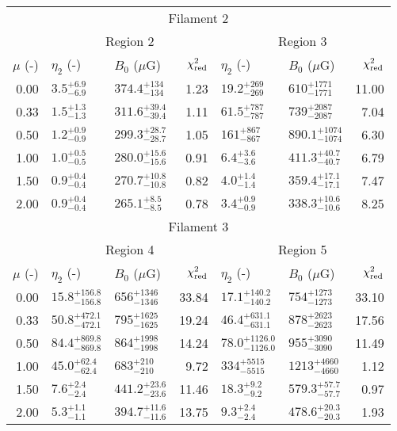 \begin{tabular}{@{}rllr llr@{}}

\toprule
\multicolumn{7}{c}{Filament 2} \\
\cmidrule{1-7}
{} & \multicolumn{3}{c}{Region 2\tablenotemark{a}}
   & \multicolumn{3}{c}{Region 3} \\
\cmidrule(lr){2-4} \cmidrule(l){5-7}
$\mu$ (-) & $\eta_2$ (-) & $B_0$ ($\mu$G) & $\chi^2_{\mathrm{red}}$
          & $\eta_2$ (-) & $B_0$ ($\mu$G) & $\chi^2_{\mathrm{red}}$ \\
\cmidrule{1-7}
0.00 & ${3.5}^{+6.9}_{-6.9}$ & ${374.4}^{+134}_{-134}$ & 1.23
     & ${19.2}^{+269}_{-269}$ & ${610}^{+1771}_{-1771}$ & 11.00 \\
0.33 & ${1.5}^{+1.3}_{-1.3}$ & ${311.6}^{+39.4}_{-39.4}$ & 1.11
     & ${61.5}^{+787}_{-787}$ & ${739}^{+2087}_{-2087}$ & 7.04 \\
0.50 & ${1.2}^{+0.9}_{-0.9}$ & ${299.3}^{+28.7}_{-28.7}$ & 1.05
     & ${161}^{+867}_{-867}$ & ${890.1}^{+1074}_{-1074}$ & 6.30 \\
1.00 & ${1.0}^{+0.5}_{-0.5}$ & ${280.0}^{+15.6}_{-15.6}$ & 0.91
     & ${6.4}^{+3.6}_{-3.6}$ & ${411.3}^{+40.7}_{-40.7}$ & 6.79 \\
1.50 & ${0.9}^{+0.4}_{-0.4}$ & ${270.7}^{+10.8}_{-10.8}$ & 0.82
     & ${4.0}^{+1.4}_{-1.4}$ & ${359.4}^{+17.1}_{-17.1}$ & 7.47 \\
2.00 & ${0.9}^{+0.4}_{-0.4}$ & ${265.1}^{+8.5}_{-8.5}$ & 0.78
     & ${3.4}^{+0.9}_{-0.9}$ & ${338.3}^{+10.6}_{-10.6}$ & 8.25 \\

\midrule
\multicolumn{7}{c}{Filament 3} \\
\cmidrule{1-7}
{} & \multicolumn{3}{c}{Region 4}
   & \multicolumn{3}{c}{Region 5} \\
\cmidrule(lr){2-4} \cmidrule(l){5-7}
$\mu$ (-) & $\eta_2$ (-) & $B_0$ ($\mu$G) & $\chi^2_{\mathrm{red}}$
          & $\eta_2$ (-) & $B_0$ ($\mu$G) & $\chi^2_{\mathrm{red}}$ \\
\cmidrule{1-7}

0.00 & ${15.8}^{+156.8}_{-156.8}$ & ${656}^{+1346}_{-1346}$ & 33.84
     & ${17.1}^{+140.2}_{-140.2}$ & ${754}^{+1273}_{-1273}$ & 33.10 \\
0.33 & ${50.8}^{+472.1}_{-472.1}$ & ${795}^{+1625}_{-1625}$ & 19.24
     & ${46.4}^{+631.1}_{-631.1}$ & ${878}^{+2623}_{-2623}$ & 17.56 \\
0.50 & ${84.4}^{+869.8}_{-869.8}$ & ${864}^{+1998}_{-1998}$ & 14.24
     & ${78.0}^{+1126.0}_{-1126.0}$ & ${955}^{+3090}_{-3090}$ & 11.49 \\
1.00 & ${45.0}^{+62.4}_{-62.4}$ & ${683}^{+210}_{-210}$ & 9.72
     & ${334}^{+5515}_{-5515}$ & ${1213}^{+4660}_{-4660}$ & 1.12 \\
1.50 & ${7.6}^{+2.4}_{-2.4}$ & ${441.2}^{+23.6}_{-23.6}$ & 11.46
     & ${18.3}^{+9.2}_{-9.2}$ & ${579.3}^{+57.7}_{-57.7}$ & 0.97 \\
2.00 & ${5.3}^{+1.1}_{-1.1}$ & ${394.7}^{+11.6}_{-11.6}$ & 13.75
     & ${9.3}^{+2.4}_{-2.4}$ & ${478.6}^{+20.3}_{-20.3}$ & 1.93 \\


\end{tabular}
